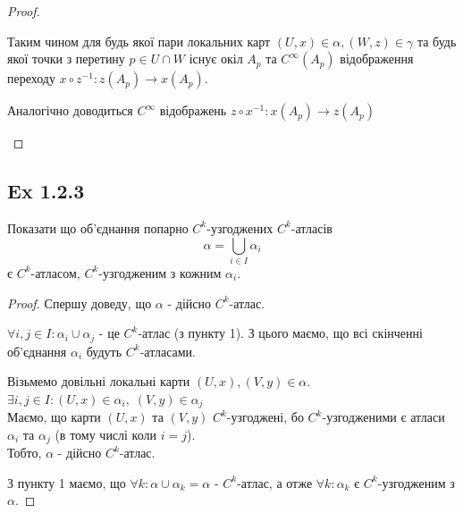 \documentclass[10pt, a4paper]{article} %
\newcommand{\todo}[1]{\colorbox{red}{\textbf{TODO}: #1}}
\begin{document}
\begin{proof}
\begin{itemize}
        Таким чином для будь якої пари локальних карт $(U,x)\in\alpha, (W,z)\in\gamma$ 
        та будь якої точки з перетину $p\in U\cap W$ 
        існує окіл $A_p$ та $C^\infty(A_p)$ відображення переходу $x\circ z^{-1} : z(A_p) \to x(A_p)$.
      
        Аналогічно доводиться $C^\infty$ відображень $z \circ x^{-1} : x(A_p) \to z(A_p)$


    \end{itemize}
\end{proof}

\newpage
\subsection*{Ex 1.2.3}
\begin{mdframed}
    Показати що об'єднання попарно $C^k$-узгоджених $C^k$-атласів 
    \[\alpha = \bigcup_{i\in I} \alpha_i\] 
    є $C^k$-атласом, $C^k$-узгодженим з кожним $\alpha_i$.
\end{mdframed}

\begin{proof}
    
Спершу доведу, що $\alpha$ - дійсно $C^k$-атлас.

$\forall i,j\in I: \alpha_i \cup \alpha_j$ - це $C^k$-атлас (з пункту 1). З цього маємо, що всі скінченні об'єднання $\alpha_i$ будуть $C^k$-атласами.

Візьмемо довільні локальні карти $(U,x), (V,y) \in \alpha$.\\
$\exists i,j\in I: (U,x) \in \alpha_i, \; (V,y)\in\alpha_j$\\
Маємо, що карти $(U,x)$ та $(V,y)$ $C^k$-узгоджені, бо $C^k$-узгодженими є атласи $\alpha_i$ та $\alpha_j$ (в тому числі коли $i=j$).\\
Тобто, $\alpha$ - дійсно $C^k$-атлас.

З пункту 1 маємо, що $\forall k: \alpha \cup \alpha_k = \alpha$ - $C^k$-атлас, а отже $\forall k: \alpha_k$ є $C^k$-узгодженим з $\alpha$.

\end{proof}
\end{document}
